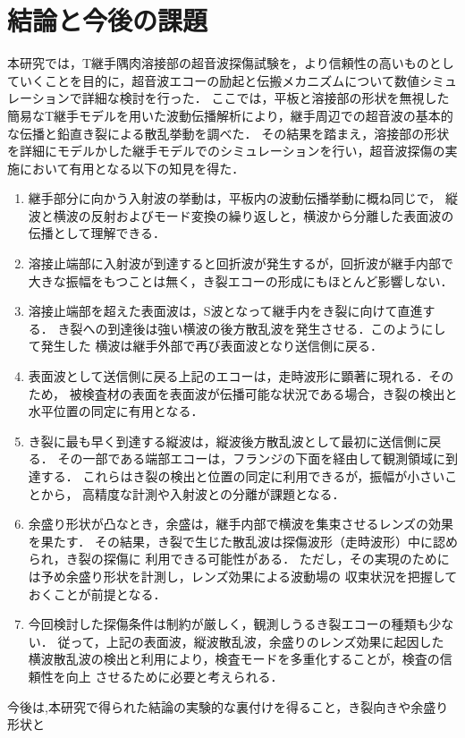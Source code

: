 ﻿\documentclass[11pt,a4j]{mybook2}
\begin{document}
\chapter{結論と今後の課題}
本研究では，T継手隅肉溶接部の超音波探傷試験を，より信頼性の高いものとしていくことを目的に，超音波エコーの励起と伝搬メカニズムについて数値シミュレーションで詳細な検討を行った．
ここでは，平板と溶接部の形状を無視した簡易なT継手モデルを用いた波動伝播解析により，継手周辺での超音波の基本的な伝播と鉛直き裂による散乱挙動を調べた．
その結果を踏まえ，溶接部の形状を詳細にモデルかした継手モデルでのシミュレーションを行い，超音波探傷の実施において有用となる以下の知見を得た．
\begin{enumerate}
\item
	継手部分に向かう入射波の挙動は，平板内の波動伝播挙動に概ね同じで，
縦波と横波の反射およびモード変換の繰り返しと，横波から分離した表面波の伝播として理解できる．
\item
	溶接止端部に入射波が到達すると回折波が発生するが，回折波が継手内部で
	大きな振幅をもつことは無く，き裂エコーの形成にもほとんど影響しない．
\item
	溶接止端部を超えた表面波は，S波となって継手内をき裂に向けて直進する．
	き裂への到達後は強い横波の後方散乱波を発生させる．このようにして発生した
	横波は継手外部で再び表面波となり送信側に戻る．
\item
	表面波として送信側に戻る上記のエコーは，走時波形に顕著に現れる．そのため，
	被検査材の表面を表面波が伝播可能な状況である場合，き裂の検出と
	水平位置の同定に有用となる．
\item
	き裂に最も早く到達する縦波は，縦波後方散乱波として最初に送信側に戻る．
	その一部である端部エコーは，フランジの下面を経由して観測領域に到達する．
	これらはき裂の検出と位置の同定に利用できるが，振幅が小さいことから，
	高精度な計測や入射波との分離が課題となる．
\item
	余盛り形状が凸なとき，余盛は，継手内部で横波を集束させるレンズの効果を果たす．
	その結果，き裂で生じた散乱波は探傷波形（走時波形）中に認められ，き裂の探傷に
	利用できる可能性がある．
	ただし，その実現のためには予め余盛り形状を計測し，レンズ効果による波動場の
	収束状況を把握しておくことが前提となる．
\item
	今回検討した探傷条件は制約が厳しく，観測しうるき裂エコーの種類も少ない．
	従って，上記の表面波，縦波散乱波，余盛りのレンズ効果に起因した
	横波散乱波の検出と利用により，検査モードを多重化することが，検査の信頼性を向上
	させるために必要と考えられる．
\end{enumerate}
今後は,本研究で得られた結論の実験的な裏付けを得ること，き裂向きや余盛り形状と
\end{document}

